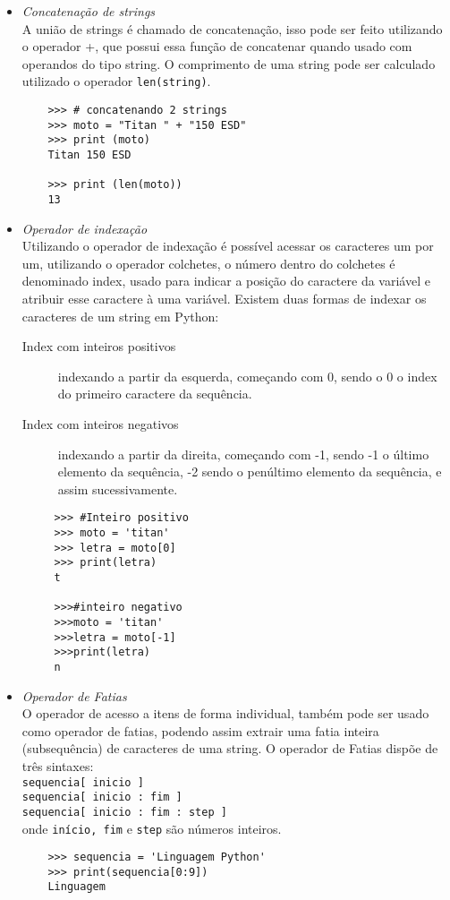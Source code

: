     \begin{itemize}
      \item \textit{Concatenação de strings}\\
            A união de strings é chamado de concatenação, isso pode ser feito utilizando o operador +, que possui essa função de concatenar quando usado com operandos do tipo string. O comprimento de uma string pode ser calculado utilizado o operador \texttt{len(string)}.
     \begin{lstlisting}
    >>> # concatenando 2 strings
    >>> moto = "Titan " + "150 ESD"
    >>> print (moto)
    Titan 150 ESD
    
    >>> print (len(moto))
    13
    \end{lstlisting}

      \item \textit{Operador de indexação}\\
      Utilizando o operador de indexação é possível acessar os caracteres um por um, utilizando o operador colchetes, o número dentro do colchetes é denominado index, usado para indicar a posição do caractere da variável e atribuir esse caractere à uma variável.
      Existem duas formas de indexar os caracteres de um string em Python:\\
      \begin{description}
        \item[Index com inteiros positivos] indexando a partir da esquerda, começando com 0, sendo o 0 o index do primeiro caractere da sequência.
        \item[Index com inteiros negativos] indexando a partir da direita, começando com -1, sendo -1 o último elemento da sequência, -2 sendo o penúltimo elemento da sequência, e assim sucessivamente.
      \end{description}

     \begin{lstlisting}
     >>> #Inteiro positivo
     >>> moto = 'titan'
     >>> letra = moto[0]
     >>> print(letra)
     t
     
     >>>#inteiro negativo
     >>>moto = 'titan'
     >>>letra = moto[-1]
     >>>print(letra)
     n
        \end{lstlisting}


      \item \textit{Operador de Fatias}\\
      O operador de acesso a itens de forma individual, também pode ser usado como operador de fatias, podendo assim extrair uma fatia inteira (subsequência) de caracteres de uma string. O operador de Fatias dispõe de três sintaxes:\\
      \texttt{sequencia[ inicio ]}\\
      \texttt{sequencia[ inicio : fim ]} \\
      \texttt{sequencia[ inicio : fim : step ]}\\
      onde \texttt{início, fim} e \texttt{step} são números inteiros.
     \begin{lstlisting}
    >>> sequencia = 'Linguagem Python'
    >>> print(sequencia[0:9])
    Linguagem
    

\end{lstlisting}
\end{itemize}
